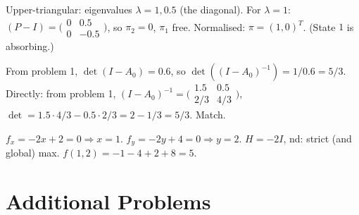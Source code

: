 \begin{solutions}
  \item Upper-triangular: eigenvalues $\lambda = 1, 0.5$ (the diagonal).
        For $\lambda = 1$:
        $(P - I) = \bigl(\begin{smallmatrix} 0 & 0.5 \\ 0 & -0.5 \end{smallmatrix}\bigr)$,
        so $\pi_{2} = 0$, $\pi_{1}$ free. Normalised: $\pi = (1, 0)^{T}$.
        (State $1$ is absorbing.)

  \item From problem 1, $\det(I - A_{0}) = 0.6$, so
        $\det((I - A_{0})^{-1}) = 1/0.6 = 5/3$. Directly: from problem 1,
        $(I - A_{0})^{-1} = \bigl(\begin{smallmatrix} 1.5 & 0.5 \\ 2/3 & 4/3 \end{smallmatrix}\bigr)$,
        $\det = 1.5 \cdot 4/3 - 0.5 \cdot 2/3 = 2 - 1/3 = 5/3$. Match.

  \item $f_{x} = -2 x + 2 = 0 \Rightarrow x = 1$.
        $f_{y} = -2 y + 4 = 0 \Rightarrow y = 2$. $H = -2 I$, nd: strict
        (and global) max. $f(1, 2) = -1 - 4 + 2 + 8 = 5$.
\end{solutions}

\section{Additional Problems}


